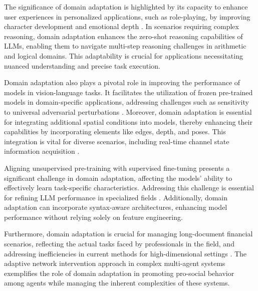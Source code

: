 The significance of domain adaptation is highlighted by its capacity to enhance user experiences in personalized applications, such as role-playing, by improving character development and emotional depth \cite{kaur2024cropcontextwiserobuststatic}. In scenarios requiring complex reasoning, domain adaptation enhances the zero-shot reasoning capabilities of LLMs, enabling them to navigate multi-step reasoning challenges in arithmetic and logical domains. This adaptability is crucial for applications necessitating nuanced understanding and precise task execution.



Domain adaptation also plays a pivotal role in improving the performance of models in vision-language tasks. It facilitates the utilization of frozen pre-trained models in domain-specific applications, addressing challenges such as sensitivity to universal adversarial perturbations \cite{yamshchikov2020styletransferparaphraselookingsensible}. Moreover, domain adaptation is essential for integrating additional spatial conditions into models, thereby enhancing their capabilities by incorporating elements like edges, depth, and poses. This integration is vital for diverse scenarios, including real-time channel state information acquisition \cite{dimov2017multidimensionalsensitivityanalysislargescale}.



Aligning unsupervised pre-training with supervised fine-tuning presents a significant challenge in domain adaptation, affecting the models' ability to effectively learn task-specific characteristics. Addressing this challenge is essential for refining LLM performance in specialized fields \cite{lin2023interpretabilityframeworksimilarcase}. Additionally, domain adaptation can incorporate syntax-aware architectures, enhancing model performance without relying solely on feature engineering.



Furthermore, domain adaptation is crucial for managing long-document financial scenarios, reflecting the actual tasks faced by professionals in the field, and addressing inefficiencies in current methods for high-dimensional settings \cite{mcguffie2020radicalizationrisksgpt3advanced}. The adaptive network intervention approach in complex multi-agent systems exemplifies the role of domain adaptation in promoting pro-social behavior among agents while managing the inherent complexities of these systems.



